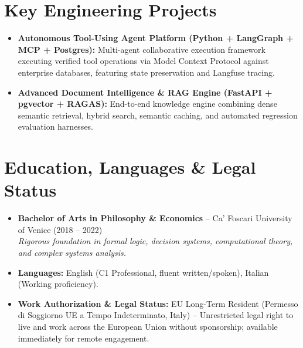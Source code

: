 \documentclass[a4paper,10pt]{article}
\begin{document}
\section{Key Engineering Projects}
\begin{itemize}
  \item \textbf{Autonomous Tool-Using Agent Platform (Python + LangGraph + MCP + Postgres):} Multi-agent collaborative execution framework executing verified tool operations via Model Context Protocol against enterprise databases, featuring state preservation and Langfuse tracing.
  \item \textbf{Advanced Document Intelligence \& RAG Engine (FastAPI + pgvector + RAGAS):} End-to-end knowledge engine combining dense semantic retrieval, hybrid search, semantic caching, and automated regression evaluation harnesses.
\end{itemize}

\section{Education, Languages \& Legal Status}
\begin{itemize}
  \item \textbf{Bachelor of Arts in Philosophy \& Economics} -- Ca' Foscari University of Venice (2018 -- 2022) \\
  \textit{Rigorous foundation in formal logic, decision systems, computational theory, and complex systems analysis.}
  \item \textbf{Languages:} English (C1 Professional, fluent written/spoken), Italian (Working proficiency).
  \item \textbf{Work Authorization \& Legal Status:} EU Long-Term Resident (Permesso di Soggiorno UE a Tempo Indeterminato, Italy) -- Unrestricted legal right to live and work across the European Union without sponsorship; available immediately for remote engagement.
\end{itemize}
\end{document}

